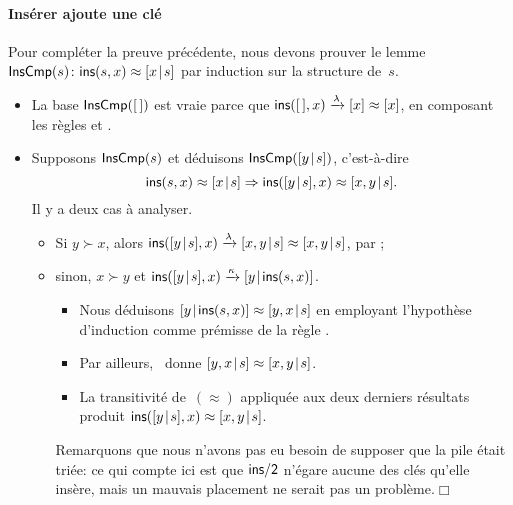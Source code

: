 \paragraph{Insérer ajoute une clé}

Pour compléter la preuve précédente, nous devons prouver le lemme
 \(\textsf{InsCmp}({s}) \colon
\textsf{ins}(s,x) \approx [{x}\!\mid\!{s}]\) par induction sur la structure
de~\(s\).
\begin{itemize}

  \item La base \(\textsf{InsCmp}({[\,]})\) est vraie parce que
  \(\textsf{ins}([\,],x) \xrightarrow{\smash{\lambda}} [x] \approx [x]\),
  en composant les règles  et .

  \item Supposons \(\textsf{InsCmp}({s})\) et déduisons
    \(\textsf{InsCmp}({[{y}\!\mid\!{s}]})\), c'est-à-dire
    \begin{equation*}
      \textsf{ins}(s,x) \approx [{x}\!\mid\!{s}] \Rightarrow
      \textsf{ins}([{y}\!\mid\!{s}],x) \approx [{x,y}\!\mid\!{s}].
    \end{equation*}
    Il y a deux cas à analyser.
    \begin{itemize}

    \item Si \(y \succ x\), alors \(\textsf{ins}([{y}\!\mid\!{s}],x)
      \xrightarrow{\smash{\lambda}} [{x,y}\!\mid\!{s}] \approx
      [{x,y}\!\mid\!{s}]\), par ;

    \item sinon, \(x \succ y\) et \(\textsf{ins}([{y}\!\mid\!{s}],x)
      \xrightarrow{\smash{\kappa}} [{y}\!\mid\!{\textsf{ins}(s,x)}]\).
      \begin{itemize}

        \item Nous déduisons \([{y}\!\mid\!{\textsf{ins}(s,x)}] \approx
          [{y,x}\!\mid\!{s}]\) en employant l'hypothèse d'induction comme
          prémisse de la règle .

        \item Par ailleurs, ~donne \([{y,x}\!\mid\!{s}]
          \approx [{x,y}\!\mid\!{s}]\).

        \item La transitivité de~\((\approx)\) appliquée aux deux
          derniers résultats produit \(\textsf{ins}([{y}\!\mid\!{s}],x)
          \approx [{x,y}\!\mid\!{s}]\).

      \end{itemize}
      Remarquons que nous n'avons pas eu besoin de supposer que la
      pile était triée: ce qui compte ici est que \(\textsf{ins/2}\)
      n'égare aucune des clés qu'elle insère, mais un mauvais
      placement ne serait pas un problème.\hfill\(\Box\)

    \end{itemize}

\end{itemize}


